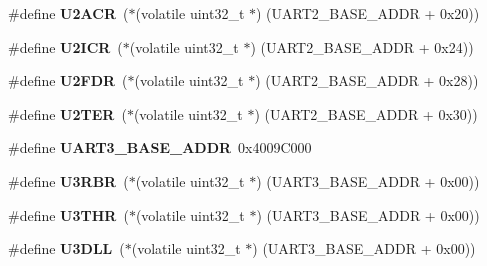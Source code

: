 \begin{DoxyCompactItemize}
\item 
\mbox{\label{group__lpc24xx__regs_ga51622692387ac00b8c7d31eeffbd0066}} 
\#define {\bfseries U2\+A\+CR}~($\ast$(volatile uint32\+\_\+t $\ast$) (U\+A\+R\+T2\+\_\+\+B\+A\+S\+E\+\_\+\+A\+D\+DR + 0x20))
\item 
\mbox{\label{group__lpc24xx__regs_ga6b5b3441ccc5212def461d49052d615b}} 
\#define {\bfseries U2\+I\+CR}~($\ast$(volatile uint32\+\_\+t $\ast$) (U\+A\+R\+T2\+\_\+\+B\+A\+S\+E\+\_\+\+A\+D\+DR + 0x24))
\item 
\mbox{\label{group__lpc24xx__regs_gae8f848930120e1049c445643c54355e3}} 
\#define {\bfseries U2\+F\+DR}~($\ast$(volatile uint32\+\_\+t $\ast$) (U\+A\+R\+T2\+\_\+\+B\+A\+S\+E\+\_\+\+A\+D\+DR + 0x28))
\item 
\mbox{\label{group__lpc24xx__regs_ga954edc55c936d73884c34228e13b5ceb}} 
\#define {\bfseries U2\+T\+ER}~($\ast$(volatile uint32\+\_\+t $\ast$) (U\+A\+R\+T2\+\_\+\+B\+A\+S\+E\+\_\+\+A\+D\+DR + 0x30))
\item 
\mbox{\label{group__lpc24xx__regs_gacf5180b61294d939aead776031994b32}} 
\#define {\bfseries U\+A\+R\+T3\+\_\+\+B\+A\+S\+E\+\_\+\+A\+D\+DR}~0x4009\+C000
\item 
\mbox{\label{group__lpc24xx__regs_gaf27de47d3595f2d410da893a867aff4b}} 
\#define {\bfseries U3\+R\+BR}~($\ast$(volatile uint32\+\_\+t $\ast$) (U\+A\+R\+T3\+\_\+\+B\+A\+S\+E\+\_\+\+A\+D\+DR + 0x00))
\item 
\mbox{\label{group__lpc24xx__regs_gae158c57af4994ff05ba8d11e32e00ba2}} 
\#define {\bfseries U3\+T\+HR}~($\ast$(volatile uint32\+\_\+t $\ast$) (U\+A\+R\+T3\+\_\+\+B\+A\+S\+E\+\_\+\+A\+D\+DR + 0x00))
\item 
\mbox{\label{group__lpc24xx__regs_ga6d74748d1c7950f26f6f4de67f6b4e4e}} 
\#define {\bfseries U3\+D\+LL}~($\ast$(volatile uint32\+\_\+t $\ast$) (U\+A\+R\+T3\+\_\+\+B\+A\+S\+E\+\_\+\+A\+D\+DR + 0x00))
\item 
\mbox{\label{group__lpc24xx__regs_ga077c9c54c152e861978afbaf2f6cee49}} 

\end{DoxyCompactItemize}
